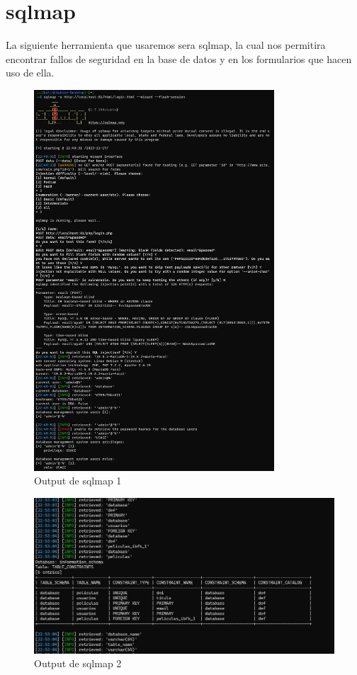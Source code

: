 \documentclass{report}
\begin{document}
        \clearpage
        \section{sqlmap}
            La siguiente herramienta que usaremos sera sqlmap, la cual nos permitira encontrar fallos de seguridad en la base de datos y en los formularios que hacen uso de ella.
            \begin{figure}[H]
                \centering
                \includegraphics[width=0.80\textwidth]{./img/audit1/sqlmap1.png}
                \caption{Output de sqlmap 1}
            \end{figure}
            \begin{figure}[H]
                \centering
                \includegraphics[width=\textwidth]{./img/audit1/sqlmap2.png}
                \caption{Output de sqlmap 2}
            \end{figure}
\end{document}
